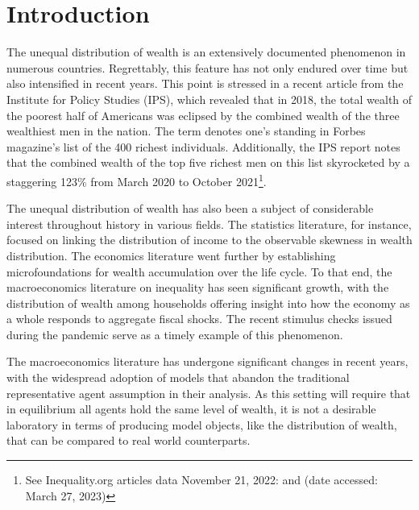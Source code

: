 
\section{Introduction}\notinsubfile{\label{sec:intro}}
\setcounter{page}{0}


\par The unequal distribution of wealth is an extensively documented phenomenon in numerous countries. Regrettably, this feature has not only endured over time but also intensified in recent years. This point is stressed in a recent article from the Institute for Policy Studies (IPS), which revealed that in 2018, the total wealth of the poorest half of Americans was eclipsed by the combined wealth of the three wealthiest men in the nation. The term  denotes one's standing in Forbes magazine's list of the 400 richest individuals. Additionally, the IPS report notes that the combined wealth of the top five richest men on this list skyrocketed by a staggering 123\% from March 2020 to October 2021\footnote{See Inequality.org articles data November 21, 2022:  and  (date accessed: March 27, 2023)}. 

\par The unequal distribution of wealth has also been a subject of considerable interest throughout history in various fields. The statistics literature, for instance, focused on linking the distribution of income to the observable skewness in wealth distribution. The economics literature went further by establishing microfoundations for wealth accumulation over the life cycle. To that end, the macroeconomics literature on inequality has seen significant growth, with the distribution of wealth among households offering insight into how the economy as a whole responds to aggregate fiscal shocks. The recent stimulus checks issued during the pandemic serve as a timely example of this phenomenon.

\par The macroeconomics literature has undergone significant changes in recent years, with the widespread adoption of models that abandon the traditional representative agent assumption in their analysis. As this setting will require that in equilibrium all agents hold the same level of wealth, it is not a desirable laboratory in terms of producing model objects, like the distribution of wealth, that can be compared to real world counterparts.

